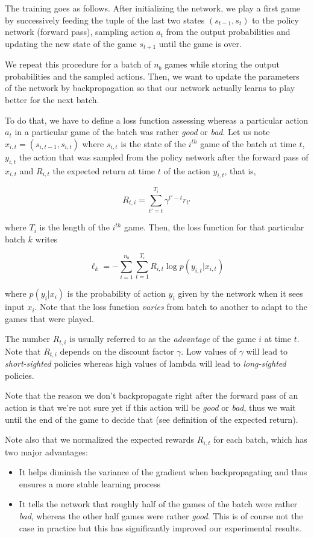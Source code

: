 \documentclass{article}
\begin{document}
The training goes as follows. After initializing the network, we play a first game by successively feeding the tuple of the last two states $(s_{t-1}, s_t)$ to the policy network (forward pass), sampling action $a_t$ from the output probabilities and updating the new state of the game $s_{t + 1}$ until the game is over.

We repeat this procedure for a batch of $n_b$ games while storing the output probabilities and the sampled actions. Then, we want to update the parameters of the network by backpropagation so that our network actually learns to play better for the next batch.

To do that, we have to define a loss function assessing whereas a particular action $a_t$ in a particular game  of the batch was rather \textit{good} or \textit{bad}. Let us note $x_{i, t} = (s_{i, t - 1}, s_{i, t})$ where $s_{i,t}$ is the state of the $i^{th}$ game of the batch at time $t$, $y_{i, t}$ the action that was sampled from the policy network after the forward pass of $x_{i, t}$ and $R_{i, t}$ the expected return at time $t$ of the action $y_{i, t}$, that is,

\[R_{t, i} = \sum_{t' = t}^{T_i} \gamma^{t' - t} r_{t'}\]

where $T_i$ is the length of the $i^{th}$ game. Then, the loss function for that particular batch $k$ writes

\[\ell_k = - \sum_{i = 1}^{n_b} \sum_{t = 1}^{T_i} R_{i, t} \log p(y_{i, t} | x_{i, t})\]

where $p(y_i | x_i)$ is the probability of action $y_i$ given by the network when it sees input $x_i$. Note that the loss function \textit{varies} from batch to another to adapt to the games that were played.

The number $R_{t, i}$ is usually referred to as the \textit{advantage} of the game $i$ at time $t$. Note that $R_{t, i}$ depends on the discount factor $\gamma$. Low values of $\gamma$ will lead to \textit{short-sighted} policies whereas high values of lambda will lead to \textit{long-sighted} policies.

Note that the reason we don't backpropagate right after the forward pass of an action is that we're not sure yet if this action will be \textit{good} or \textit{bad}, thus we wait until the end of the game to decide that (see definition of the expected return).

Note also that we normalized the expected rewards $R_{i, t}$ for each batch, which has two major advantages:
\begin{itemize}
\item It helps diminish the variance of the gradient when backpropagating and thus ensures a more stable learning process
\item It tells the network that roughly half of the games of the batch were rather \textit{bad}, whereas the other half games were rather \textit{good}. This is of course not the case in practice but this has significantly improved our experimental results.
\end{itemize}
\end{document}
